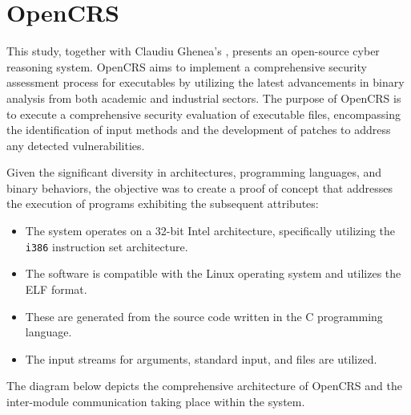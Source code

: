 \documentclass[../main.tex]{subfiles}
\begin{document}
\hypertarget{opencrs}{%
  \chapter{OpenCRS}\label{opencrs}}

This study, together with Claudiu Ghenea's \cite{ghenea}, presents an
open-source cyber reasoning system. OpenCRS aims to implement a comprehensive
security assessment process for executables by utilizing the latest
advancements in binary analysis from both academic and industrial sectors. The
purpose of OpenCRS is to execute a comprehensive security evaluation of
executable files, encompassing the identification of input methods and the
development of patches to address any detected vulnerabilities.

Given the significant diversity in architectures, programming languages, and
binary behaviors, the objective was to create a proof of concept that addresses
the execution of programs exhibiting the subsequent attributes:

\begin{itemize}
  \tightlist
  \item
        The system operates on a 32-bit Intel architecture, specifically
        utilizing the \texttt{i386} instruction set architecture.
  \item
        The software is compatible with the Linux operating system and
        utilizes the ELF format.
  \item
        These are generated from the source code written in the C programming
        language.
  \item
        The input streams for arguments, standard input, and files are
        utilized.
\end{itemize}

The diagram below depicts the comprehensive architecture of OpenCRS and the
inter-module communication taking place within the system.
\end{document}
